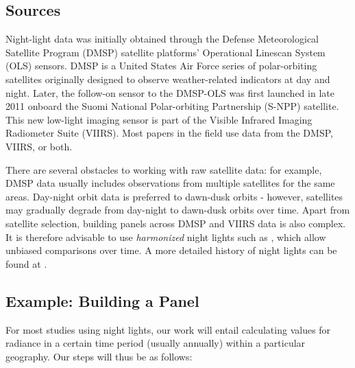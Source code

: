 \documentclass[12pt]{article}
\begin{document}
\subsection{Sources}

Night-light data was initially obtained through the Defense Meteorological Satellite Program (DMSP) satellite platforms' Operational Linescan System (OLS) sensors. DMSP is a United States Air Force series of polar-orbiting satellites originally designed to observe weather-related indicators at day and night. Later, the follow-on sensor to the DMSP-OLS was first launched in late 2011 onboard the Suomi National Polar-orbiting Partnership (S-NPP) satellite. This new low-light imaging sensor is part of the Visible Infrared Imaging Radiometer Suite (VIIRS). Most papers in the field use data from the DMSP, VIIRS, or both.

There are several obstacles to working with raw satellite data: for example, DMSP data usually includes observations from multiple satellites for the same areas. Day-night orbit data is preferred to dawn-dusk orbits - however, satellites may gradually degrade from day-night to dawn-dusk orbits over time. Apart from satellite selection, building panels across DMSP and VIIRS data is also complex. It is therefore advisable to use \textit{harmonized} night lights such as \textcite{Li2020}, which allow unbiased comparisons over time. A more detailed history of night lights can be found at \textcite{wb_github}.

\subsection{Example: Building a Panel}

For most studies using night lights, our work will entail calculating values for radiance in a certain time period (usually annually) within a particular geography. Our steps will thus be as follows: 
\end{document}
